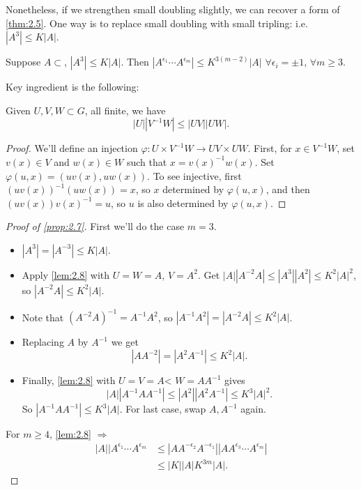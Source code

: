 \documentclass{article}
\numberwithin{equation}{section}
\begin{document}
Nonetheless, if we strengthen small doubling slightly, we can recover a form of \cref{thm:2.5}.
One way is to replace small doubling with small tripling: i.e.\ $|A^3| \leq K|A|$.
\begin{nprop}\label{prop:2.7}
  Suppose $A \subset $, $|A^3| \leq K|A|$. Then $|A^{\epsilon_1} \dotsm A^{\epsilon_m}| \leq K^{3(m-2)} |A|$ $\forall \epsilon_i = \pm 1$, $\forall m \geq 3$.
\end{nprop}
Key ingredient is the following:
\begin{nlemma}\label{lem:2.8}
  Given $U,V,W \subset G$, all finite, we have
  \begin{equation*}
    |U| |V^{-1} W| \leq |UV| |UW|.
  \end{equation*}
\end{nlemma}
\begin{proof}
  We'll define an injection $\varphi: U \times V^{-1} W \to UV \times UW$.
  First, for $x \in V^{-1}W$, set $v(x) \in V$ and $w(x) \in W$ such that $x = v(x)^{-1} w(x)$.
  Set $\varphi(u,x) = (uv(x), uw(x))$. To see injective, first $(uv(x))^{-1} (uw(x)) = x$, so $x$ determined by $\varphi(u,x)$, and then $(uv(x))v(x)^{-1} = u$, so $u$ is also determined by $\varphi(u,x)$.
\end{proof}
\begin{proof}[Proof of \cref{prop:2.7}]
  First we'll do the case $m=3$.
  \begin{itemize}
    \item $|A^3| = |A^{-3}| \leq K|A|$.
    \item Apply \cref{lem:2.8} with $U=W=A$, $V = A^2$.
      Get $|A| |A^{-2} A| \leq |A^3| |A^2| \leq K^2 |A|^2$, so $|A^{-2} A| \leq K^2 |A|$.
    \item Note that $(A^{-2} A)^{-1} = A^{-1} A^2$, so $|A^{-1} A^2| = |A^{-2} A| \leq K^2 |A|$.
    \item Replacing $A$ by $A^{-1}$ we get
      \begin{equation*}
        |A A^{-2}| = |A^2 A^{-1}| \leq K^2 |A|.
      \end{equation*}
    \item Finally, \cref{lem:2.8} with $U=V=A$< $W = A A^{-1}$ gives
      \begin{equation*}
        |A| |A^{-1} A A^{-1}| \leq |A^2| |A^2 A^{-1}| \leq K^3 |A|^2.
      \end{equation*}
      So $|A^{-1} A A^{-1}| \leq K^3 |A|$. For last case, swap $A,A^{-1}$ again.
  \end{itemize}
  For $m \geq 4$, \cref{lem:2.8} $\Rightarrow$
  \begin{align*}
    |A| |A^{\epsilon_1} \dotsm A^{\epsilon_m} &\leq |A A^{-\epsilon_2} A^{-\epsilon_1}| |A A^{\epsilon_3} \dotsm  A^{\epsilon_m}| \\
                                              & \leq |K| |A| K^{3m} |A|.
  \end{align*}
\end{proof}
\end{document}
